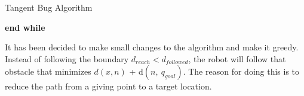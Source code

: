\documentclass[../Head/Main.tex]{subfiles}
\begin{document}
\begin{Pseudo}{Tangent Bug Algorithm}{}
\begin{Indentation}
\begin{Indentation}
\begin{Indentation}
\begin{Indentation}
\begin{itemize}
				\end{itemize}	
														
				\end{Indentation}			
			
			\end{Indentation}
		\item \textbf{end while}
		\end{Indentation}

	\end{Indentation}
	
\end{Pseudo}

It has been decided to make small changes to the algorithm and make it greedy. Instead of following the boundary $d_{reach} < d_{followed}$, the robot will follow that obstacle that minimizes ${d(x,n)}$ + d$\left(n,~q_{goal}\right)$. The reason for doing this is to reduce the path from a giving point to a target location.       
\end{document}
